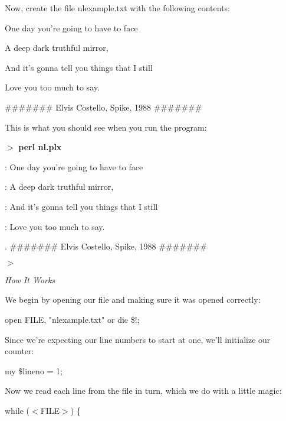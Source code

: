 \documentclass[a4paper,11pt]{book}
\begin{document}
\noindent Now, create the file nlexample.txt with the following contents:

\noindent 

\noindent One day you're going to have to face

\noindent A deep dark truthful mirror,

\noindent And it's gonna tell you things that I still

\noindent Love you too much to say.

\noindent \#\#\#\#\#\#\# Elvis Costello, Spike, 1988 \#\#\#\#\#\#\#

\noindent 

\noindent 

\noindent This is what you should see when you run the program:

\noindent 

\noindent $>$ \textbf{perl nl.plx}

: One day you're going to have to face

: A deep dark truthful mirror,

: And it's gonna tell you things that I still

: Love you too much to say.

. \#\#\#\#\#\#\# Elvis Costello, Spike, 1988 \#\#\#\#\#\#\#

\noindent $>$

\noindent 

\noindent \textit{How It Works}

\noindent We begin by opening our file and making sure it was opened correctly:

\noindent 

\noindent 

\noindent open FILE, "nlexample.txt" or die \$!;

\noindent 

\noindent Since we're expecting our line numbers to start at one, we'll initialize our counter:

\noindent 

\noindent 

\noindent my \$lineno = 1;

\noindent 

\noindent Now we read each line from the file in turn, which we do with a little magic:

\noindent 

\noindent 

\noindent while ($<$FILE$>$) \{
\end{document}

